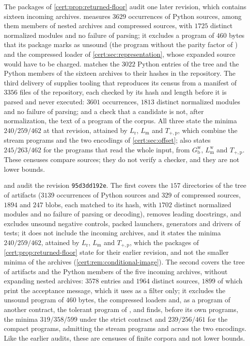 The packages of \cref{cert:prop:returned-floor} audit one later revision, which
contains sixteen incoming archives.  measures
$3629$ occurrences of Python sources, among them members of nested archives and
compressed sources, with $1725$ distinct normalized modules and no failure of
parsing; it excludes a program of $460$ bytes that its package marks as unsound
(the program without the parity factor of ) and the
compressed loader of \cref{cert:sec:representation}, whose expanded source would
have to be charged.  matches the $3022$ Python entries of
the tree and the Python members of the sixteen archives to their hashes in the
repository. The third delivery of  supplies tooling
that reproduces its census from a manifest of $3356$ files of the repository,
each checked by its hash and length before it is parsed and never executed:
$3601$ occurrences, $1813$ distinct normalized modules and no failure of parsing;
and a check that a candidate is not, after normalization, the text of a program
of the corpus. All three state the minima $240/259/462$ at that revision,
attained by $L_{\mathrm r}$, $L_{\mathrm m}$ and $T_{+,\mathrm p}$, which combine
the stream programs and the two encodings of \cref{cert:sec:offset};
 also states $245/263/462$ for the programs that read the
whole input, from $G^{\mathrm w}_{\mathrm b}$, $L^{\mathrm w}_{\mathrm m}$ and
$T_{+,\mathrm p}$. These censuses compare sources; they do not verify a checker,
and they are not lower bounds.

 and  audit the revision
\texttt{95d3dd192e}. The first covers the $157$ directories of the tree of
artifacts ($3139$ occurrences of Python sources and $329$ of compressed sources,
$1894$ and $247$ blobs, each matched to its hash, with $1702$ distinct normalized
modules and no failure of parsing or decoding), removes leading docstrings, and
excludes unsound negative controls, packed launchers, generators and drivers of
tests; it does not include the incoming archives, and it states the minima
$240/259/462$, attained by $L_{\mathrm r}$, $L_{\mathrm m}$ and $T_{+,\mathrm p}$,
which the packages of \cref{cert:prop:returned-floor} state for their earlier
revision, and not the smaller minima of the archives
(\cref{cert:rem:conditional-image}). The second covers the tree of artifacts and
the Python members of the five incoming archives, without expanding nested
archives: $3578$ entries and $1964$ distinct sources, $1899$ of which print the
acceptance message, which it uses as a filter only; it excludes the unsound
program of $460$ bytes, the compressed loaders and, as a program of another
contract, the tolerant program of , and finds, before
its own programs, the minima $319/358/599$ under the strict contract and $239/256/461$ for the compact
programs, admitting the stream programs and across the two encodings. Like the
earlier audits, these are censuses of finite corpora and not lower bounds.

